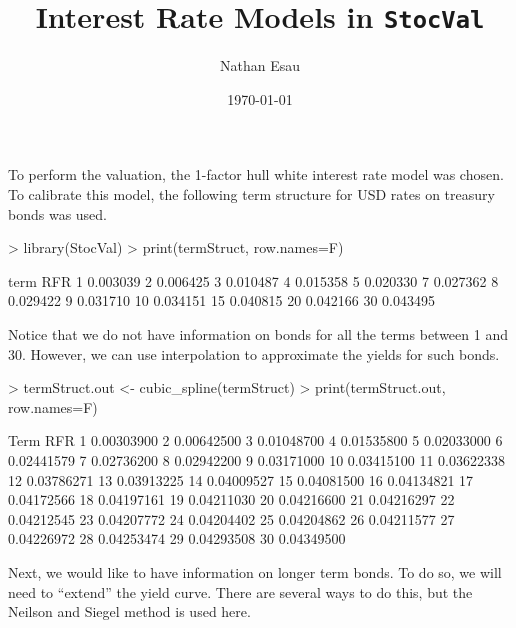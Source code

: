 \documentclass[12pt]{article}
\title{Interest Rate Models in \texttt{StocVal}}
\author{Nathan Esau}
\date{\today}
\begin{document}


\maketitle

To perform the valuation, the 1-factor hull white interest rate model was chosen.
To calibrate this model, the following term structure for USD rates on treasury bonds 
was used.

\begin{Schunk}
\begin{Sinput}
> library(StocVal)
> print(termStruct, row.names=F)
\end{Sinput}
\begin{Soutput}
 term      RFR
    1 0.003039
    2 0.006425
    3 0.010487
    4 0.015358
    5 0.020330
    7 0.027362
    8 0.029422
    9 0.031710
   10 0.034151
   15 0.040815
   20 0.042166
   30 0.043495
\end{Soutput}
\end{Schunk}

Notice that we do not have information on bonds for all the terms between 1 and 30.
However, we can use interpolation to approximate the yields for such bonds.

\begin{Schunk}
\begin{Sinput}
> termStruct.out <- cubic_spline(termStruct)
> print(termStruct.out, row.names=F)
\end{Sinput}
\begin{Soutput}
 Term        RFR
    1 0.00303900
    2 0.00642500
    3 0.01048700
    4 0.01535800
    5 0.02033000
    6 0.02441579
    7 0.02736200
    8 0.02942200
    9 0.03171000
   10 0.03415100
   11 0.03622338
   12 0.03786271
   13 0.03913225
   14 0.04009527
   15 0.04081500
   16 0.04134821
   17 0.04172566
   18 0.04197161
   19 0.04211030
   20 0.04216600
   21 0.04216297
   22 0.04212545
   23 0.04207772
   24 0.04204402
   25 0.04204862
   26 0.04211577
   27 0.04226972
   28 0.04253474
   29 0.04293508
   30 0.04349500
\end{Soutput}
\end{Schunk}

Next, we would like to have information on longer term bonds. To do so, we will
need to ``extend'' the yield curve. There are several ways to do this, but 
the Neilson and Siegel method is used here.
\end{document}
